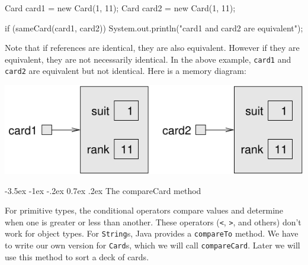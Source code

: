 \documentclass[12pt]{book}
\makeatletter
\renewcommand{\section}{\@startsection {section}{1}{\z@}%
    {-3.5ex \@plus -1ex \@minus -.2ex}%
    {0.7ex \@plus.2ex}%
    {\normalfont\Large\bfseries}}
\theoremstyle{exercise}
\newcommand{\java}[1]{\lstinline{#1}} %
\makeatother
\begin{document}
\begin{code}
    Card card1 = new Card(1, 11);
    Card card2 = new Card(1, 11);

    if (sameCard(card1, card2)) {
        System.out.println("card1 and card2 are equivalent");
    }
\end{code}

Note that if references are identical, they are also equivalent.
However if they are equivalent, they are not necessarily identical.
In the above example, \java{card1} and \java{card2} are equivalent but not identical.
Here is a memory diagram:

\begin{center}
\includegraphics{figs/card.pdf}
\end{center}




\section{The compareCard method}
\label{compare}


For primitive types, the conditional operators compare values and determine when one is greater or less than another.
These operators (\java{<}, \java{>}, and others) don't work for object types.
For \java{String}s, Java provides a \java{compareTo} method.
We have to write our own version for \java{Card}s, which we will call \java{compareCard}.
Later we will use this method to sort a deck of cards.

\end{document}
